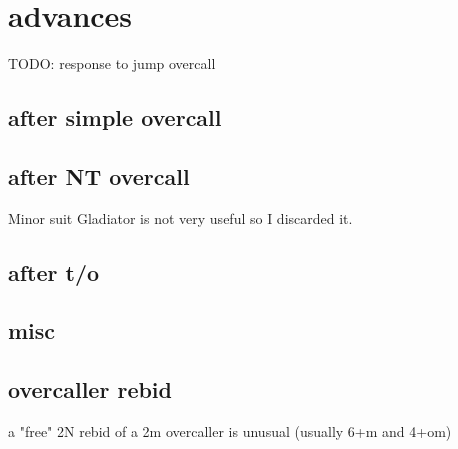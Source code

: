 
\section{advances}

TODO: response to jump overcall
\subsection{after simple overcall}


\subsection{after NT overcall}


Minor suit Gladiator is not very useful so I discarded it.

\subsection{after t/o}


\subsection{misc}


\subsection{overcaller rebid}

a "free" 2N rebid of a 2m overcaller is unusual (usually 6+m and 4+om)
